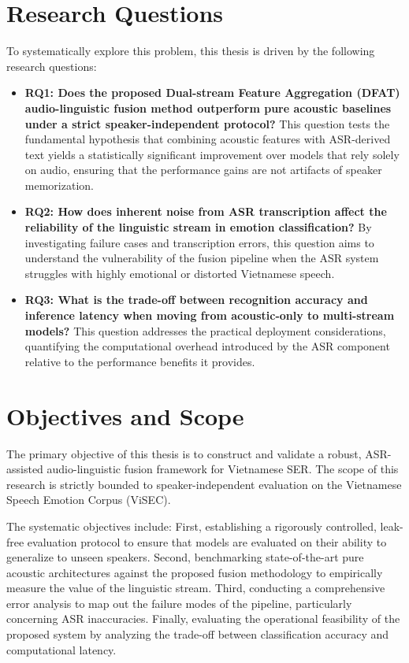 \documentclass[12pt,a4paper]{report}
\begin{document}
\section{Research Questions}
To systematically explore this problem, this thesis is driven by the following research questions:
\begin{itemize}
    \item \textbf{RQ1: Does the proposed Dual-stream Feature Aggregation (DFAT) audio-linguistic fusion method outperform pure acoustic baselines under a strict speaker-independent protocol?} This question tests the fundamental hypothesis that combining acoustic features with ASR-derived text yields a statistically significant improvement over models that rely solely on audio, ensuring that the performance gains are not artifacts of speaker memorization.
    \item \textbf{RQ2: How does inherent noise from ASR transcription affect the reliability of the linguistic stream in emotion classification?} By investigating failure cases and transcription errors, this question aims to understand the vulnerability of the fusion pipeline when the ASR system struggles with highly emotional or distorted Vietnamese speech.
    \item \textbf{RQ3: What is the trade-off between recognition accuracy and inference latency when moving from acoustic-only to multi-stream models?} This question addresses the practical deployment considerations, quantifying the computational overhead introduced by the ASR component relative to the performance benefits it provides.
\end{itemize}

\section{Objectives and Scope}
The primary objective of this thesis is to construct and validate a robust, ASR-assisted audio-linguistic fusion framework for Vietnamese SER. The scope of this research is strictly bounded to speaker-independent evaluation on the Vietnamese Speech Emotion Corpus (ViSEC). 

The systematic objectives include: First, establishing a rigorously controlled, leak-free evaluation protocol to ensure that models are evaluated on their ability to generalize to unseen speakers. Second, benchmarking state-of-the-art pure acoustic architectures against the proposed fusion methodology to empirically measure the value of the linguistic stream. Third, conducting a comprehensive error analysis to map out the failure modes of the pipeline, particularly concerning ASR inaccuracies. Finally, evaluating the operational feasibility of the proposed system by analyzing the trade-off between classification accuracy and computational latency. 
\end{document}
